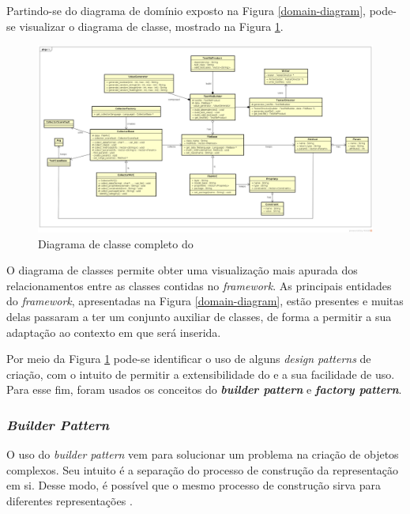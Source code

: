 Partindo-se do diagrama de domínio exposto na Figura \ref{domain-diagram}, pode-se
visualizar o diagrama de classe, mostrado na Figura \ref{class-diagram}.
\begin{figure}[h]
  \centering
    \includegraphics[width=\textwidth]{figuras/class-diagram.png}
    \caption{Diagrama de classe completo do \Scarefault}
    \label{class-diagram}
\end{figure}
\FloatBarrier

O diagrama de classes permite obter uma visualização mais apurada dos
relacionamentos entre as classes contidas no \textit{framework}. As principais
entidades do \textit{framework}, apresentadas na Figura \ref{domain-diagram},
estão presentes e muitas delas passaram a ter um conjunto auxiliar de classes,
de forma a permitir a sua adaptação ao contexto em que será inserida.

Por meio da Figura \ref{class-diagram} pode-se identificar o uso de alguns
\textit{design patterns} de criação, com o intuito de permitir a
extensibilidade do \framework e a sua facilidade de uso. Para esse fim,
foram usados os conceitos do \textbf{\textit{builder pattern}} e
\textbf{\textit{factory pattern}}.

\subsubsection{\textit{Builder Pattern}}
O uso do \textit{builder pattern} vem para solucionar um problema
na criação de objetos complexos. Seu intuito é a separação do processo
de construção da representação em si. Desse modo, é possível que o
mesmo processo de construção sirva para diferentes representações
\cite{gammaEtAl1994}.

